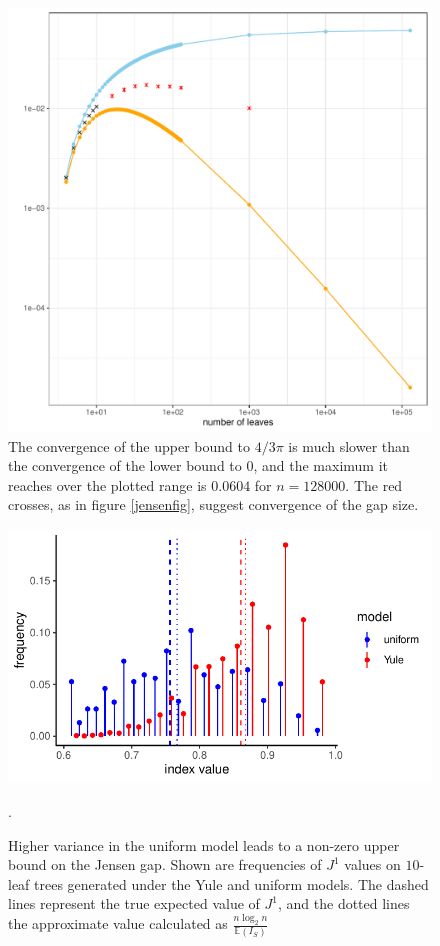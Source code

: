 \begin{figure}[h]
    \centering
    \includegraphics[width=\textwidth]{Chapter_2/figures/jensen_gap_1k.pdf}
    \caption{The convergence of the upper bound to $4/3\pi$ is much slower than
    the convergence of the lower bound to $0$, and the maximum it reaches over
    the plotted range is $0.0604$ for $n=128000$. The red crosses, as in figure
    \ref{jensenfig}, suggest convergence of the gap size.}
    \label{conv_upper_fig}
\end{figure}
\begin{figure}[h]
    \centering
    \includegraphics{Chapter_2/figures/var_fig.pdf}
    \caption{Higher variance in the uniform model leads to a non-zero upper
    bound on the Jensen gap. Shown are frequencies of $J^1$ values on $10$-leaf
    trees generated under the Yule and uniform models. The dashed lines
    represent the true expected value of $J^1$, and the dotted lines the
    approximate value calculated as $\frac{n\log_2n}{\mathbb{E}(I_S)}$}.
    \label{var_fig}
\end{figure}
\clearpage

